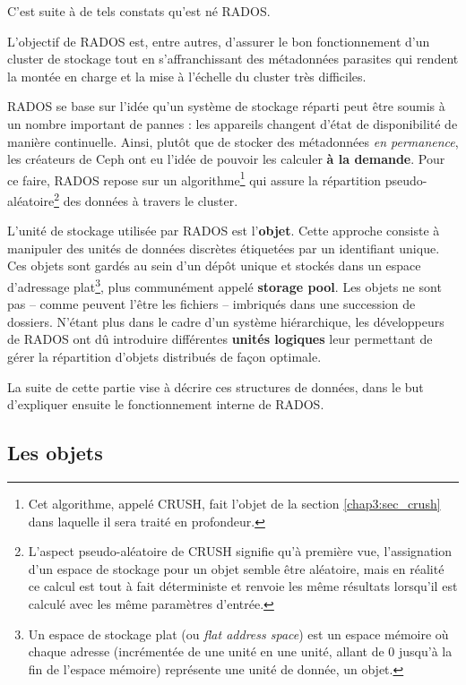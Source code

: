 C'est suite à de tels constats qu'est né RADOS.

\begin{PimpedBox}
L'objectif de RADOS est, entre autres, d'assurer le bon fonctionnement d'un cluster de stockage tout en s'affranchissant des métadonnées \og{}parasites\fg{} qui rendent la montée en charge et la mise à l'échelle du cluster très difficiles.
\end{PimpedBox}

RADOS se base sur l'idée qu'un système de stockage réparti peut être soumis à un nombre important de pannes : les appareils changent d'état de disponibilité de manière continuelle. Ainsi, plutôt que de stocker des métadonnées \emph{en permanence}, les créateurs de Ceph ont eu l'idée de pouvoir les calculer \og{}\textbf{à la demande}\fg{}. Pour ce faire, RADOS repose sur un algorithme\footnote{Cet algorithme, appelé CRUSH, fait l'objet de la section \ref{chap3:sec_crush} dans laquelle il sera traité en profondeur.} qui assure la répartition pseudo-aléatoire\footnote{L'aspect pseudo-aléatoire de CRUSH signifie qu'à première vue, l'assignation d'un espace de stockage pour un objet semble être aléatoire, mais en réalité ce calcul est tout à fait déterministe et renvoie les même résultats lorsqu'il est calculé avec les même paramètres d'entrée.} des données à travers le cluster. 

L'unité de stockage utilisée par RADOS est l'\textbf{objet}. Cette approche consiste à manipuler des unités de données discrètes étiquetées par un identifiant unique. Ces objets sont gardés au sein d'un dépôt unique et stockés dans un espace d'adressage plat\footnote{Un espace de stockage plat (ou \emph{flat address space}) est un espace mémoire où chaque adresse (incrémentée de une unité en une unité, allant de 0 jusqu'à la fin de l'espace mémoire) représente une unité de donnée, \eg un objet.}, plus communément appelé \og{}\textbf{storage pool}\fg{}. Les objets ne sont pas -- comme peuvent l'être les fichiers -- imbriqués dans une succession de dossiers.
N'étant plus dans le cadre d'un système hiérarchique, les développeurs de RADOS ont dû introduire différentes \textbf{unités logiques} leur permettant de gérer la répartition d'objets distribués de façon optimale.

La suite de cette partie vise à décrire ces structures de données, dans le but d'expliquer ensuite le fonctionnement interne de RADOS.

\subsection{Les objets}


